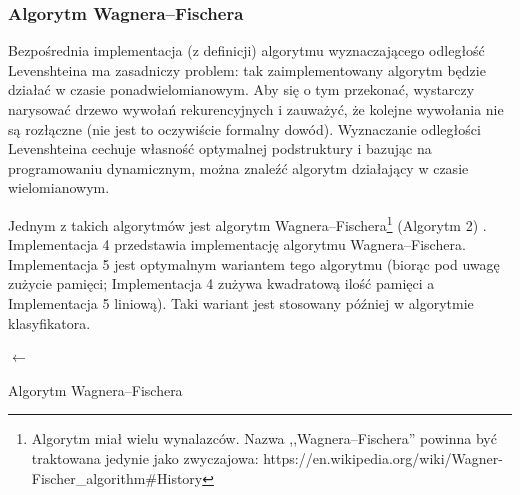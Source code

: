\subsubsection{Algorytm Wagnera--Fischera}
Bezpośrednia implementacja (z definicji) algorytmu wyznaczającego odległość
Levenshteina ma zasadniczy problem: tak zaimplementowany algorytm będzie działać
w czasie ponadwielomianowym. Aby się o tym przekonać, wystarczy narysować drzewo
wywołań rekurencyjnych i zauważyć, że kolejne wywołania nie są rozłączne (nie
jest to oczywiście formalny dowód). Wyznaczanie odległości Levenshteina cechuje
własność optymalnej podstruktury i bazując na programowaniu dynamicznym, można
znaleźć algorytm działający w czasie wielomianowym.

Jednym z takich algorytmów jest algorytm Wagnera--Fischera\footnote{Algorytm
	miał wielu wynalazców. Nazwa ,,Wagnera--Fischera'' powinna być traktowana
	jedynie jako zwyczajowa:
	https://en.wikipedia.org/wiki/Wagner-Fischer\_algorithm\#History} (Algorytm 2)
\cite{wagner1974string}. Implementacja 4 przedstawia implementację algorytmu
Wagnera--Fischera. Implementacja 5 jest optymalnym wariantem tego algorytmu
(biorąc pod uwagę zużycie pamięci; Implementacja 4 zużywa kwadratową ilość
pamięci a Implementacja 5 liniową). Taki wariant jest stosowany później w
algorytmie klasyfikatora.

\begin{algorithm}
	\SetAlgoVlined
	\BlankLine
	\BlankLine
	\VarD $\leftarrow$ \VarE{$0 \dots$ \VarM, $0 \dots$ \VarN}\;
	\Return{\VarD{\VarM, \VarN}}\;
	\caption{Algorytm Wagnera--Fischera}
\end{algorithm}



